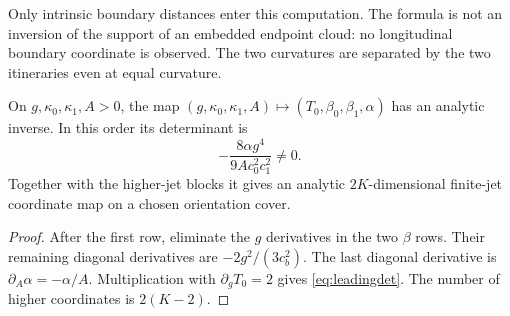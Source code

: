 Only intrinsic boundary distances enter this computation. The formula is
not an inversion of the support of an embedded endpoint cloud: no
longitudinal boundary coordinate is observed. The two curvatures are
separated by the two itineraries even at equal curvature.

\begin{corollary}\label{cor:leadingchart}
On $g,\kappa_0,\kappa_1,A>0$, the map
$(g,\kappa_0,\kappa_1,A)\mapsto(T_0,\beta_0,\beta_1,\alpha)$
has an analytic inverse. In this order its determinant is
\begin{equation}\label{eq:leadingdet}
 -\frac{8\alpha g^4}{9A c_0^2c_1^2}\ne0.
\end{equation}
Together with the higher-jet blocks it gives an analytic $2K$-dimensional
finite-jet coordinate map on a chosen orientation cover.
\end{corollary}
\begin{proof}
After the first row, eliminate the $g$ derivatives in the two
$\beta$ rows. Their remaining diagonal derivatives are
$-2g^2/(3c_b^2)$. The last diagonal derivative is
$\partial_A\alpha=-\alpha/A$. Multiplication with
$\partial_gT_0=2$ gives \eqref{eq:leadingdet}. The number of higher
coordinates is $2(K-2)$.
\end{proof}
